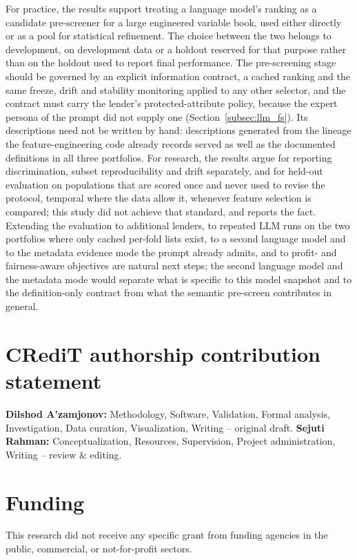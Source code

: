 \documentclass[final,5p,twocolumn]{elsarticle}
\begin{document}
For practice, the results support treating a language model's ranking as a candidate pre-screener for a large engineered variable book, used either directly or as a pool for statistical refinement. The choice between the two belongs to development, on development data or a holdout reserved for that purpose rather than on the holdout used to report final performance. The pre-screening stage should be governed by an explicit information contract, a cached ranking and the same freeze, drift and stability monitoring applied to any other selector, and the contract must carry the lender's protected-attribute policy, because the expert persona of the prompt did not supply one (Section~\ref{subsec:llm_fs}). Its descriptions need not be written by hand: descriptions generated from the lineage the feature-engineering code already records served as well as the documented definitions in all three portfolios. For research, the results argue for reporting discrimination, subset reproducibility and drift separately, and for held-out evaluation on populations that are scored once and never used to revise the protocol, temporal where the data allow it, whenever feature selection is compared; this study did not achieve that standard, and reports the fact. Extending the evaluation to additional lenders, to repeated LLM runs on the two portfolios where only cached per-fold lists exist, to a second language model and to the metadata evidence mode the prompt already admits, and to profit- and fairness-aware objectives are natural next steps; the second language model and the metadata mode would separate what is specific to this model snapshot and to the definition-only contract from what the semantic pre-screen contributes in general.


\section*{CRediT authorship contribution statement}
\textbf{Dilshod A'zamjonov:} Methodology, Software, Validation, Formal analysis, Investigation, Data curation, Visualization, Writing -- original draft. \textbf{Sejuti Rahman:} Conceptualization, Resources, Supervision, Project administration, Writing -- review \& editing.

\section*{Funding}
This research did not receive any specific grant from funding agencies in the public, commercial, or not-for-profit sectors.
\end{document}

